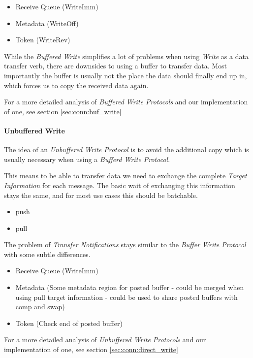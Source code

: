 \begin{itemize}
  \item Receive Queue (WriteImm)
  \item Metadata (WriteOff)
  \item Token (WriteRev)
\end{itemize}

While the \emph{Buffered Write} simplifies a lot of problems when using \emph{Write} as a data transfer verb, there are 
downsides to using a buffer to transfer data. Most importantly the buffer is usually not the place the data should finally 
end up in, which forces us to copy the received data again.

For a more detailed analysis of \emph{Buffered Write Protocols} and our implementation of one, see section \ref{sec:conn:buf_write}


\paragraph{Unbuffered Write}
The idea of an \emph{Unbuffered Write Protocol} is to avoid the additional copy which is usually necessary when using a
\emph{Bufferd Write Protocol}. 

This means to be able to transfer data we need to exchange the complete \emph{Target Information} for each message. The basic
wait of exchanging this information stays the same, and for most use cases this should be batchable.

\begin{itemize}
  \item push
  \item pull
\end{itemize}

The problem of \emph{Transfer Notifications} stays similar to the \emph{Buffer Write Protocol} with some subtle differences.

\begin{itemize}
  \item Receive Queue (WriteImm)
  \item Metadata (Some metadata region for posted buffer - could be merged when using pull target information - could be used to share posted buffers with comp and swap)
  \item Token (Check end of posted buffer)
\end{itemize}


For a more detailed analysis of \emph{Unbuffered Write Protocols} and our implementation of one, see section \ref{sec:conn:direct_write}


